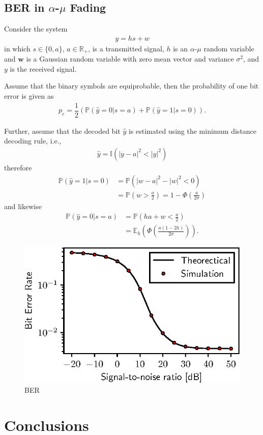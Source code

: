 \documentclass[conference, 10pt]{IEEEtran}
\begin{document}
\subsection{BER in $\alpha$-$\mu$ Fading}

Consider the system
\begin{align}
    y = hs + w
\end{align}
in which $s \in \{0, a\}$, $a \in \mathbb{R}_{+}$, is a transmitted signal,
$h$ is an $\alpha$-$\mu$ random variable and $\bm{w}$ is a Gaussian random variable
with zero mean vector and variance $\sigma^2$, and $y$ is the received signal.

Assume that the binary symbols are equiprobable, then the probability of one bit error
is given as
\begin{align}
    p_{e} = \dfrac{1}{2}\left(\mathbb{P}\left(\hat{y} = 0 | s = a\right)
                            + \mathbb{P}\left(\hat{y} = 1 | s = 0\right)\right).
\end{align}

Further, assume that the decoded bit $\hat{y}$ is estimated using the minimum distance decoding
rule, i.e.,
\begin{align}
    \hat{y} = \mathbb{I}(|y - a|^2 < |y|^2)
\end{align}
therefore
\begin{align}
    \mathbb{P}\left(\hat{y} = 1 | s = 0\right) & = \mathbb{P}\left(|w - a|^2 - |w|^2 < 0\right)\nonumber\\
    & = \mathbb{P}\left(w > \frac{a}{2}\right) = 1 - \Phi\left(\frac{a}{2\sigma}\right)
\end{align}
and likewise
\begin{align}
    \mathbb{P}\left(\hat{y} = 0 | s = a\right) & = \mathbb{P}\left(ha + w < \frac{a}{2}\right) \nonumber\\
    & = \mathbb{E}_h\left(\Phi\left(\frac{a(1 - 2h)}{2\sigma}\right)\right).
\end{align}

\begin{figure}[!htb]
    \centering
    \includegraphics{figures/ber.eps}
    \caption{BER}
    \label{fig:ber}
\end{figure}

\section{Conclusions}



\end{document}

